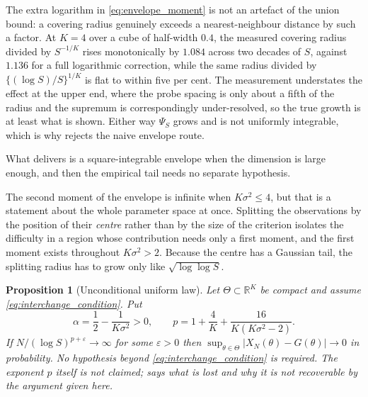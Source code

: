 \documentclass[11pt]{article}
\newtheorem{proposition}[proposition]{Proposition}
\theoremstyle{definition}
\newcommand{\R}{\mathbb{R}}
\begin{document}
The extra logarithm in \eqref{eq:envelope_moment} is not an artefact of the union bound: a covering radius genuinely exceeds a nearest-neighbour distance by such a factor. At $K=4$ over a cube of half-width $0.4$, the measured covering radius divided by $S^{-1/K}$ rises monotonically by $1.084$ across two decades of $S$, against $1.136$ for a full logarithmic correction, while the same radius divided by $\{(\log S)/S\}^{1/K}$ is flat to within five per cent. The measurement understates the effect at the upper end, where the probe spacing is only about a fifth of the radius and the supremum is correspondingly under-resolved, so the true growth is at least what is shown. Either way $\Psi_S$ grows and is not uniformly integrable, which is why  rejects the naive envelope route.

What  delivers is a square-integrable envelope when the dimension is large enough, and then the empirical tail needs no separate hypothesis.

The second moment of the envelope is infinite when $K\sigma^2\le4$, but that is a statement about the whole parameter space at once. Splitting the observations by the position of their \emph{centre} rather than by the size of the criterion isolates the difficulty in a region whose contribution needs only a first moment, and the first moment exists throughout $K\sigma^2>2$. Because the centre has a Gaussian tail, the splitting radius has to grow only like $\sqrt{\log\log S}$.

\begin{proposition}[Unconditional uniform law]\label{prop:uniform_lln_all}
Let $\Theta\subset\R^K$ be compact and assume \eqref{eq:interchange_condition}. Put
\begin{equation}\label{eq:tail_exponent}
\alpha=\frac12-\frac1{K\sigma^2}>0,
\qquad
p=1+\frac4K+\frac{16}{K(K\sigma^2-2)} .
\end{equation}
If $N/(\log S)^{p+\varepsilon}\to\infty$ for some $\varepsilon>0$ then $\sup_{\theta\in\Theta}\lvert X_N(\theta)-G(\theta)\rvert\to0$ in probability. No hypothesis beyond \eqref{eq:interchange_condition} is required. The exponent $p$ itself is \emph{not} claimed;  says what is lost and why it is not recoverable by the argument given here.
\end{proposition}
\end{document}
